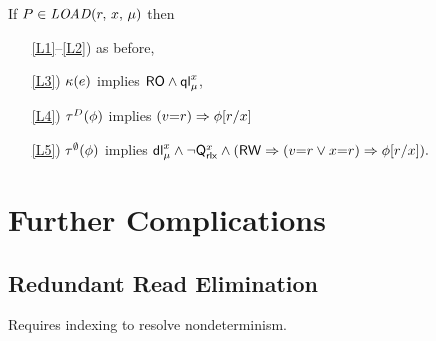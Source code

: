 \begin{definition}
  \noindent
  If $\aPS \in \sLOAD[\amode]{\aReg}{\aLoc}$ then
  \begin{enumerate}
  \item[\ref{L1}--\ref{L2})] as before,
  \item[\ref{L3})]
    $\labelingForm(\aEv)$ implies
    \begin{math}
      \RO
      \land \QL{\aLoc}{\amode}
    \end{math},
  \item[\ref{L4})]
    $\aTr[\bEvs](\aForm)$ implies
    \begin{math}
      (\aVal{=}\aReg)
      \limplies \aForm[\aReg/{\aLoc}]
    \end{math}
  \item[\ref{L5})] 
    $\aTr[\emptyset](\aForm)$ implies
    \begin{math}
      \DL{\aLoc}{\amode}
      \land \lnot\Qx{\aLoc}
      \land 
      (\RW
      \limplies (\aVal{=}\aReg\lor\aLoc{=}\aReg) 
      \limplies \aForm[\aReg/{\aLoc}]
      ).
    \end{math}
  \end{enumerate}  
\end{definition}



\section{Further Complications}

\subsection{Redundant Read Elimination}

Requires indexing to resolve nondeterminism.

